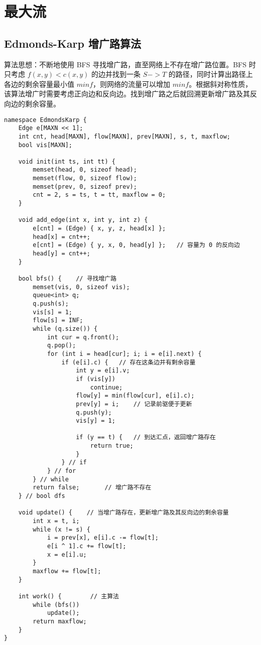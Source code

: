 \section{最大流}

\subsection{Edmonds-Karp 增广路算法}

\par 算法思想：不断地使用 BFS 寻找增广路，直至网络上不存在增广路位置。BFS 时只考虑 $f(x,y) < c(x,y)$ 的边并找到一条 $S->T$ 的路径，同时计算出路径上各边的剩余容量最小值 $minf$，则网络的流量可以增加 $minf$。根据斜对称性质，该算法增广时需要考虑正向边和反向边。找到增广路之后就回溯更新增广路及其反向边的剩余容量。
\begin{verbatim}
namespace EdmondsKarp {
    Edge e[MAXN << 1];
    int cnt, head[MAXN], flow[MAXN], prev[MAXN], s, t, maxflow;
    bool vis[MAXN];
  
    void init(int ts, int tt) {
        memset(head, 0, sizeof head);
        memset(flow, 0, sizeof flow);
        memset(prev, 0, sizeof prev);
        cnt = 2, s = ts, t = tt, maxflow = 0;
    }

    void add_edge(int x, int y, int z) {
        e[cnt] = (Edge) { x, y, z, head[x] };
        head[x] = cnt++;
        e[cnt] = (Edge) { y, x, 0, head[y] };   // 容量为 0 的反向边
        head[y] = cnt++;
    }

    bool bfs() {    // 寻找增广路
        memset(vis, 0, sizeof vis);
        queue<int> q;
        q.push(s);
        vis[s] = 1;
        flow[s] = INF;
        while (q.size()) {
            int cur = q.front();
            q.pop();
            for (int i = head[cur]; i; i = e[i].next) {
                if (e[i].c) {   // 存在这条边并有剩余容量
                    int y = e[i].v;
                    if (vis[y])
                        continue;
                    flow[y] = min(flow[cur], e[i].c);
                    prev[y] = i;    // 记录前驱便于更新
                    q.push(y);
                    vis[y] = 1;

                    if (y == t) {   // 到达汇点，返回增广路存在
                        return true;
                    }
                } // if
            } // for
        } // while
        return false;       // 增广路不存在
    } // bool dfs

    void update() {    // 当增广路存在，更新增广路及其反向边的剩余容量
        int x = t, i;
        while (x != s) {
            i = prev[x], e[i].c -= flow[t];
            e[i ^ 1].c += flow[t];
            x = e[i].u;
        }
        maxflow += flow[t];
    }

    int work() {        // 主算法
        while (bfs())
            update();
        return maxflow;
    }
}
\end{verbatim}

